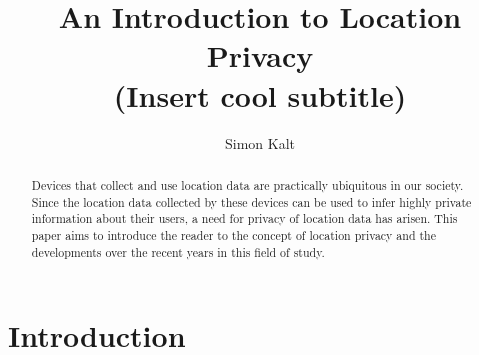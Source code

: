 \documentclass[twocolumn, a4paper, 10pt]{article}
\begin{document}
\title{
    {\Large An Introduction to Location Privacy \\}
    {\large (Insert cool subtitle)}
}

\author{
    Simon Kalt
}

\maketitle

\def\abstractname{{\textbf Abstract}}
\begin{abstract}
{
Devices that collect and use location data are practically ubiquitous in our society. Since the location data collected by these devices can be used to infer highly private information about their users, a need for privacy of location data has arisen. This paper aims to introduce the reader to the concept of location privacy and the developments over the recent years in this field of study.
}
\end{abstract}


\section{Introduction}
\lipsum[1-3]



{
    
    
}

\appendix
\end{document}
